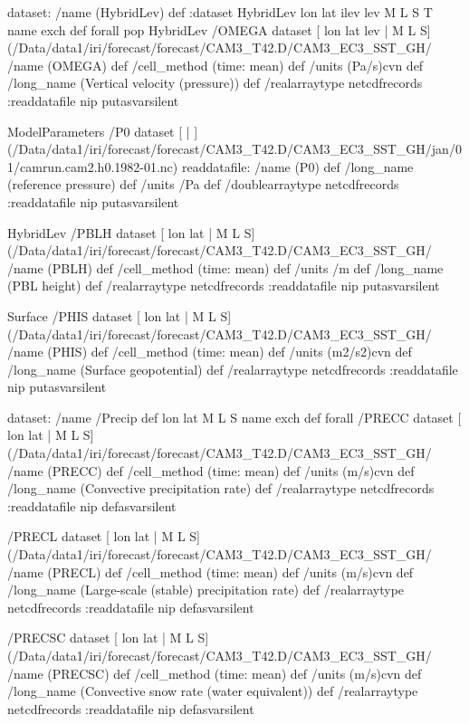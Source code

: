\begin{ingrid}
dataset: /name (HybridLev) def :dataset
HybridLev { lon lat ilev lev M L S T} {name exch def} forall pop
HybridLev /OMEGA{
dataset
[ lon lat lev | M L S] (/Data/data1/iri/forecast/forecast/CAM3_T42.D/CAM3_EC3_SST_GH/%
/name (OMEGA) def
 /cell_method (time: mean) def
 /units (Pa/s)cvn def
 /long_name (Vertical velocity (pressure)) def
 /realarraytype netcdfrecords :readdatafile
nip
}putasvarsilent

ModelParameters /P0{
dataset
[ | ] (/Data/data1/iri/forecast/forecast/CAM3_T42.D/CAM3_EC3_SST_GH/jan/01/camrun.cam2.h0.1982-01.nc) readdatafile:
/name (P0) def
 /long_name (reference pressure) def
 /units /Pa def
 /doublearraytype netcdfrecords :readdatafile
nip
}putasvarsilent


HybridLev  /PBLH{
dataset
[ lon lat | M L S] (/Data/data1/iri/forecast/forecast/CAM3_T42.D/CAM3_EC3_SST_GH/%
/name (PBLH) def
 /cell_method (time: mean) def
 /units /m def
 /long_name (PBL height) def
 /realarraytype netcdfrecords :readdatafile
nip
}putasvarsilent

Surface /PHIS{
dataset
[ lon lat | M L S] (/Data/data1/iri/forecast/forecast/CAM3_T42.D/CAM3_EC3_SST_GH/%
/name (PHIS) def
 /cell_method (time: mean) def
 /units (m2/s2)cvn def
 /long_name (Surface geopotential) def
 /realarraytype netcdfrecords :readdatafile
nip
}putasvarsilent

dataset: /name /Precip def
 { lon lat  M L S } {name exch def} forall
 /PRECC{
dataset
[ lon lat | M L S] (/Data/data1/iri/forecast/forecast/CAM3_T42.D/CAM3_EC3_SST_GH/%
/name (PRECC) def
 /cell_method (time: mean) def
 /units (m/s)cvn def
 /long_name (Convective precipitation rate) def
 /realarraytype netcdfrecords :readdatafile
nip
}defasvarsilent

 /PRECL{
dataset
[ lon lat | M L S] (/Data/data1/iri/forecast/forecast/CAM3_T42.D/CAM3_EC3_SST_GH/%
/name (PRECL) def
 /cell_method (time: mean) def
 /units (m/s)cvn def
 /long_name (Large-scale (stable) precipitation rate) def
 /realarraytype netcdfrecords :readdatafile
nip
}defasvarsilent

/PRECSC{
dataset
[ lon lat | M L S] (/Data/data1/iri/forecast/forecast/CAM3_T42.D/CAM3_EC3_SST_GH/%
/name (PRECSC) def
 /cell_method (time: mean) def
 /units (m/s)cvn def
 /long_name (Convective snow rate (water equivalent)) def
 /realarraytype netcdfrecords :readdatafile
nip
}defasvarsilent


\end{ingrid}
